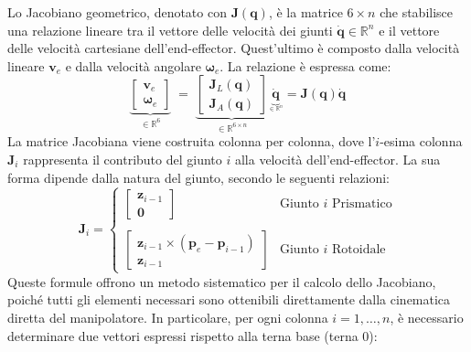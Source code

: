 \documentclass[11pt, a4paper]{report}
\begin{document}
Lo Jacobiano geometrico, denotato con \(\bm{J}(\bm{q})\), è la matrice \(6 \times n\) che stabilisce una relazione lineare tra il vettore delle velocità dei giunti \(\dot{\bm{q}} \in \mathbb{R}^n\) e il vettore delle velocità cartesiane dell'end-effector. Quest'ultimo è composto dalla velocità lineare \(\bm{v}_e\) e dalla velocità angolare \(\bm{\omega}_e\). La relazione è espressa come:
\[
    \underbrace{\begin{bmatrix}
        \bm{v}_e \\
        \bm{\omega}_e
    \end{bmatrix}}_{\in \mathbb{R}^{6}}
    \;=\;
    \underbrace{\begin{bmatrix}
        \bm{J}_{L}(\bm{q})\\
        \hline
        \bm{J}_{A}(\bm{q})
    \end{bmatrix}}_{\in \mathbb{R}^{6 \times n}}
    \underbrace{\dot{\bm{q}}}_{_{\in \mathbb{R}^{n}}}
    =
    \bm{J}(\bm{q})\dot{\bm{q}}
\]
La matrice Jacobiana viene costruita colonna per colonna, dove l'\(i\)-esima colonna \(\bm{J}_i\) rappresenta il contributo del giunto \(i\) alla velocità dell'end-effector. La sua forma dipende dalla natura del giunto, secondo le seguenti relazioni:
\begin{equation*}
    \bm{J}_i =
    \begin{cases}
        \begin{bmatrix} \bm{z}_{i-1} \\ \bm{0} \end{bmatrix} & \text{Giunto } i \text{ Prismatico} \\ \\
        \begin{bmatrix} \bm{z}_{i-1} \times (\bm{p}_e - \bm{p}_{i-1}) \\ \bm{z}_{i-1} \end{bmatrix} & \text{Giunto } i \text{ Rotoidale}
    \end{cases}
\end{equation*}
Queste formule offrono un metodo sistematico per il calcolo dello Jacobiano, poiché tutti gli elementi necessari sono ottenibili direttamente dalla cinematica diretta del manipolatore. In particolare, per ogni colonna \(i=1, \dots, n\), è necessario determinare due vettori espressi rispetto alla terna base (terna 0):
\end{document}
